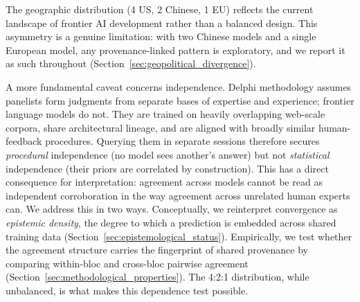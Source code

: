 \documentclass[preprint,review,12pt]{elsarticle}
\begin{document}
\begin{table}[htbp]
\centering
\caption{Multi-LLM Delphi Panel Composition}
\label{tab:panel_composition}
%
\end{table}

The geographic distribution (4 US, 2 Chinese, 1 EU) reflects the current landscape of frontier AI development rather than a balanced design. This asymmetry is a genuine limitation: with two Chinese models and a single European model, any provenance-linked pattern is exploratory, and we report it as such throughout (Section~\ref{sec:geopolitical_divergence}).

A more fundamental caveat concerns independence. Delphi methodology assumes panelists form judgments from separate bases of expertise and experience; frontier language models do not. They are trained on heavily overlapping web-scale corpora, share architectural lineage, and are aligned with broadly similar human-feedback procedures. Querying them in separate sessions therefore secures \emph{procedural} independence (no model sees another's answer) but not \emph{statistical} independence (their priors are correlated by construction). This has a direct consequence for interpretation: agreement across models cannot be read as independent corroboration in the way agreement across unrelated human experts can. We address this in two ways. Conceptually, we reinterpret convergence as \emph{epistemic density}, the degree to which a prediction is embedded across shared training data (Section~\ref{sec:epistemological_status}). Empirically, we test whether the agreement structure carries the fingerprint of shared provenance by comparing within-bloc and cross-bloc pairwise agreement (Section~\ref{sec:methodological_properties}). The 4:2:1 distribution, while unbalanced, is what makes this dependence test possible.
\end{document}
